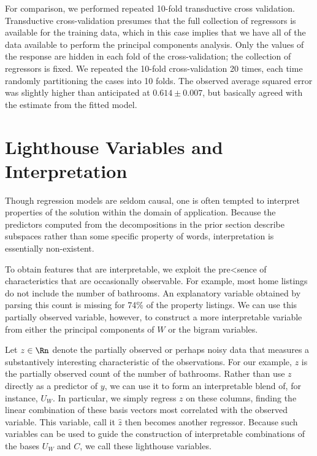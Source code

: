 \documentclass[12pt]{article}
\begin{document}
For comparison, we performed repeated 10-fold transductive cross validation.  Transductive cross-validation presumes that the full collection of regressors is available for the training data, which in this case implies that we have all of the data available to perform the principal components analysis.  Only the values of the response are hidden in each fold of the cross-validation; the collection of regressors is fixed.  We repeated the 10-fold cross-validation 20 times, each time randomly partitioning the cases into 10 folds. The observed average squared error was slightly higher than anticipated at $0.614 \pm 0.007$, but basically agreed with the estimate from the fitted model. 


\section{Lighthouse Variables and Interpretation}
\label{sec:light}
 
 Though regression models are seldom causal, one is often tempted to interpret
 properties of the solution within the domain of application.  Because the
 predictors computed from the decompositions in the prior section describe
 subspaces rather than some specific property of words, interpretation is
 essentially non-existent.


 To obtain features that are interpretable, we exploit the pre<sence of
 characteristics that are occasionally observable.  For example,
 most home listings do not include the number of bathrooms.  An
 explanatory variable obtained by parsing this count is missing for 74\% of the property listings.  We can use this partially observed variable, however, to construct a more interpretable variable from either the principal components of $W$ or the bigram variables.  


 Let $z \in \Rn$ denote the partially observed or perhaps noisy data
 that measures a substantively interesting characteristic of the
 observations.  For our example, $z$ is the partially observed count of the number of bathrooms.  Rather than use $z$ directly as a predictor of $y$, we
 can use it to form an interpretable blend of, for instance, $U_W$.   In
 particular, we simply regress $z$ on these columns, finding the
 linear combination of these basis vectors most correlated with the
 observed variable.  This variable, call it $\hat{z}$ then becomes
 another regressor.  Because such variables can be used to guide the
 construction of interpretable combinations of the bases $U_W$ and
 $C$, we call these lighthouse variables.  
 
\end{document}
